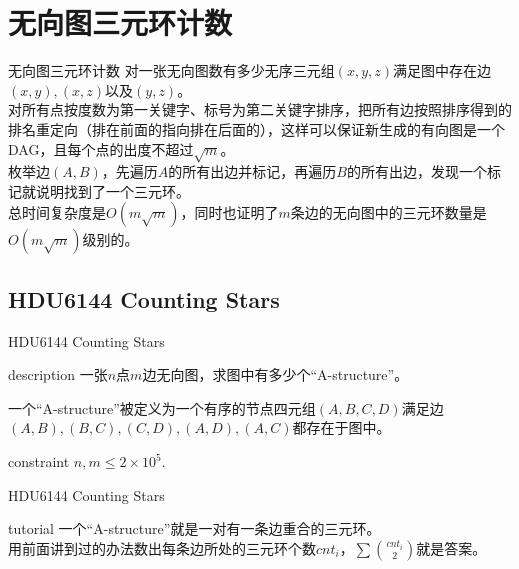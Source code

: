 \documentclass{beamer}
\begin{document}
\section{无向图三元环计数}
\begin{frame}{无向图三元环计数}
	对一张无向图数有多少无序三元组$(x,y,z)$满足图中存在边$(x,y),(x,z)$以及$(y,z)$。\pause\\
	
	对所有点按度数为第一关键字、标号为第二关键字排序，把所有边按照排序得到的排名重定向（排在前面的指向排在后面的），这样可以保证新生成的有向图是一个DAG，且每个点的出度不超过$\sqrt m$。\\
	
	枚举边$(A,B)$，先遍历$A$的所有出边并标记，再遍历$B$的所有出边，发现一个标记就说明找到了一个三元环。\\
	
	总时间复杂度是$O(m\sqrt m)$，同时也证明了$m$条边的无向图中的三元环数量是$O(m\sqrt m)$级别的。
\end{frame}

\subsection{HDU6144 Counting Stars}
\begin{frame}{HDU6144 Counting Stars}
	\begin{block}{description}
		一张$n$点$m$边无向图，求图中有多少个“A-structure”。
		
		一个“A-structure”被定义为一个有序的节点四元组$(A, B, C, D)$满足边$(A, B), (B, C), (C, D), (A, D), (A, C)$都存在于图中。
	\end{block}
	\begin{block}{constraint}
		$n, m \le 2 \times 10^5.$
	\end{block}
\end{frame}
\begin{frame}{HDU6144 Counting Stars}
	\begin{block}{tutorial}
		一个“A-structure”就是一对有一条边重合的三元环。\\
		
		用前面讲到过的办法数出每条边所处的三元环个数$cnt_i$，$\sum \binom{cnt_i}{2}$就是答案。
	\end{block}
\end{frame}
\end{document}
